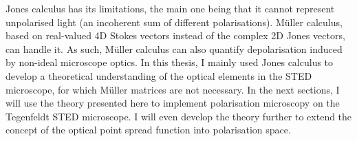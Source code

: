 Jones calculus has its limitations, the main one being that it cannot represent unpolarised light (an incoherent sum of different polarisations). Müller calculus, based on real-valued 4D Stokes vectors instead of the complex 2D Jones vectors, can handle it. As such, Müller calculus can also quantify depolarisation induced by non-ideal microscope optics. In this thesis, I mainly used Jones calculus to develop a theoretical understanding of the optical elements in the STED microscope, for which Müller matrices are not necessary. In the next sections, I will use the theory presented here to implement polarisation microscopy on the Tegenfeldt STED microscope. I will even develop the theory further to extend the concept of the optical point spread function into polarisation space.
